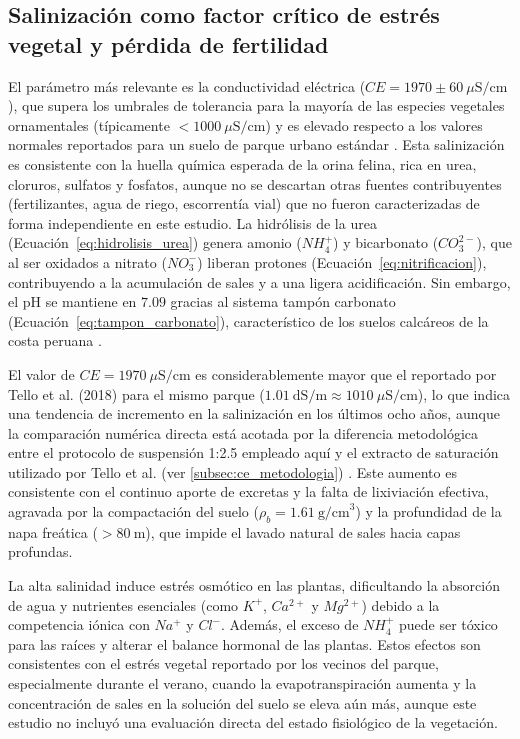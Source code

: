 \documentclass[fleqn]{jaes}
\begin{document}
\subsection{Salinización como factor crítico de estrés vegetal y pérdida de fertilidad}

El parámetro más relevante es la conductividad eléctrica ($CE = 1970 \pm 60~\mu\text{S/cm}$), que supera los umbrales de tolerancia para la mayoría de las especies vegetales ornamentales (típicamente $< 1000~\mu\text{S/cm}$) y es elevado respecto a los valores normales reportados para un suelo de parque urbano estándar \cite{Allen2020}. Esta salinización es consistente con la huella química esperada de la orina felina, rica en urea, cloruros, sulfatos y fosfatos, aunque no se descartan otras fuentes contribuyentes (fertilizantes, agua de riego, escorrentía vial) que no fueron caracterizadas de forma independiente en este estudio. La hidrólisis de la urea (Ecuación~\ref{eq:hidrolisis_urea}) genera amonio ($NH_4^+$) y bicarbonato ($CO_3^{2-}$), que al ser oxidados a nitrato ($NO_3^-$) liberan protones (Ecuación~\ref{eq:nitrificacion}), contribuyendo a la acumulación de sales y a una ligera acidificación. Sin embargo, el pH se mantiene en $7.09$ gracias al sistema tampón carbonato (Ecuación~\ref{eq:tampon_carbonato}), característico de los suelos calcáreos de la costa peruana \cite{Taalab2019}.

El valor de $CE = 1970~\mu\text{S/cm}$ es considerablemente mayor que el reportado por Tello et al. (2018) para el mismo parque ($1.01~\text{dS/m} \approx 1010~\mu\text{S/cm}$), lo que indica una tendencia de incremento en la salinización en los últimos ocho años, aunque la comparación numérica directa está acotada por la diferencia metodológica entre el protocolo de suspensión 1:2.5 empleado aquí y el extracto de saturación utilizado por Tello et al. (ver \cref{subsec:ce_metodologia}) \cite{Kargas2024}. Este aumento es consistente con el continuo aporte de excretas y la falta de lixiviación efectiva, agravada por la compactación del suelo ($\rho_b = 1.61~\text{g/cm}^3$) y la profundidad de la napa freática ($> 80~\text{m}$), que impide el lavado natural de sales hacia capas profundas.

La alta salinidad induce estrés osmótico en las plantas, dificultando la absorción de agua y nutrientes esenciales (como $K^+$, $Ca^{2+}$ y $Mg^{2+}$) debido a la competencia iónica con $Na^+$ y $Cl^-$. Además, el exceso de $NH_4^+$ puede ser tóxico para las raíces y alterar el balance hormonal de las plantas. Estos efectos son consistentes con el estrés vegetal reportado por los vecinos del parque, especialmente durante el verano, cuando la evapotranspiración aumenta y la concentración de sales en la solución del suelo se eleva aún más, aunque este estudio no incluyó una evaluación directa del estado fisiológico de la vegetación.
\end{document}
